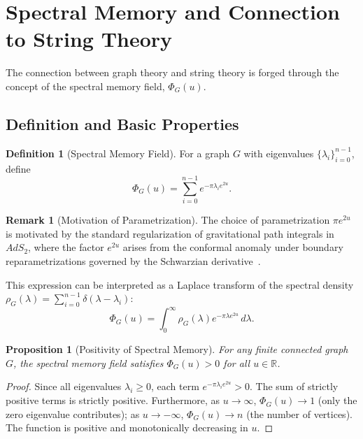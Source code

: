 \documentclass[12pt]{article}
\newtheorem{proposition}[theorem]{Proposition}
\theoremstyle{definition}
\newtheorem{definition}[theorem]{Definition}
\newtheorem{remark}[theorem]{Remark}
\newcommand{\R}{\mathbb{R}}
\begin{document}
\section{Spectral Memory and Connection to String Theory}
The connection between graph theory and string theory is forged through the concept of the spectral memory field, $\Phi_G(u)$.

\subsection{Definition and Basic Properties}
\begin{definition}[Spectral Memory Field]
For a graph $G$ with eigenvalues $\{\lambda_i\}_{i=0}^{n-1}$, define
\[
\Phi_G(u) = \sum_{i=0}^{n-1} e^{-\pi \lambda_i e^{2u}}.
\]
\end{definition}

\begin{remark}[Motivation of Parametrization]
The choice of parametrization $\pi e^{2u}$ is motivated by the standard regularization of gravitational path integrals in $AdS_2$, where the factor $e^{2u}$ arises from the conformal anomaly under boundary reparametrizations governed by the Schwarzian derivative~\cite{Saad2019, Stanford2019}.
\end{remark}

This expression can be interpreted as a Laplace transform of the spectral density $\rho_G(\lambda) = \sum_{i=0}^{n-1} \delta(\lambda - \lambda_i)$:
\[
\Phi_G(u) = \int_0^\infty \rho_G(\lambda) e^{-\pi \lambda e^{2u}} \, d\lambda.
\]

\begin{proposition}[Positivity of Spectral Memory]
For any finite connected graph $G$, the spectral memory field satisfies $\Phi_G(u) > 0$ for all $u \in \R$.
\end{proposition}

\begin{proof}
Since all eigenvalues $\lambda_i \ge 0$, each term $e^{-\pi \lambda_i e^{2u}} > 0$. The sum of strictly positive terms is strictly positive. Furthermore, as $u \to \infty$, $\Phi_G(u) \to 1$ (only the zero eigenvalue contributes); as $u \to -\infty$, $\Phi_G(u) \to n$ (the number of vertices). The function is positive and monotonically decreasing in $u$.
\end{proof}
\end{document}
